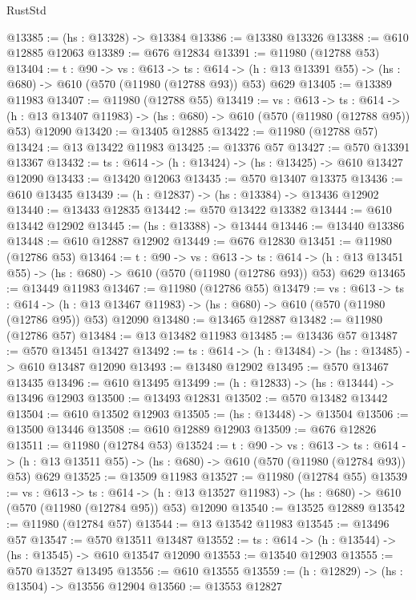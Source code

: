 \begin{lexlean}{RustStd}
\begin{coremodule}
@13385 := (hs : @13328) -> @13384
@13386 := @13380 @13326
@13388 := @610 @12885 @12063
@13389 := @676 @12834
@13391 := @11980 (@12788 @53)
@13404 := {t : @90} ->
  {vs : @613} ->
  {ts : @614} -> (h : @13 @13391 @55) -> (hs : @680) -> @610 (@570 (@11980 (@12788 @93)) @53) @629
@13405 := @13389 @11983
@13407 := @11980 (@12788 @55)
@13419 := {vs : @613} ->
  {ts : @614} ->
  (h : @13 @13407 @11983) -> (hs : @680) -> @610 (@570 (@11980 (@12788 @95)) @53) @12090
@13420 := @13405 @12885
@13422 := @11980 (@12788 @57)
@13424 := @13 @13422 @11983
@13425 := @13376 @57
@13427 := @570 @13391 @13367
@13432 := {ts : @614} -> (h : @13424) -> (hs : @13425) -> @610 @13427 @12090
@13433 := @13420 @12063
@13435 := @570 @13407 @13375
@13436 := @610 @13435
@13439 := (h : @12837) -> (hs : @13384) -> @13436 @12902
@13440 := @13433 @12835
@13442 := @570 @13422 @13382
@13444 := @610 @13442 @12902
@13445 := (hs : @13388) -> @13444
@13446 := @13440 @13386
@13448 := @610 @12887 @12902
@13449 := @676 @12830
@13451 := @11980 (@12786 @53)
@13464 := {t : @90} ->
  {vs : @613} ->
  {ts : @614} -> (h : @13 @13451 @55) -> (hs : @680) -> @610 (@570 (@11980 (@12786 @93)) @53) @629
@13465 := @13449 @11983
@13467 := @11980 (@12786 @55)
@13479 := {vs : @613} ->
  {ts : @614} ->
  (h : @13 @13467 @11983) -> (hs : @680) -> @610 (@570 (@11980 (@12786 @95)) @53) @12090
@13480 := @13465 @12887
@13482 := @11980 (@12786 @57)
@13484 := @13 @13482 @11983
@13485 := @13436 @57
@13487 := @570 @13451 @13427
@13492 := {ts : @614} -> (h : @13484) -> (hs : @13485) -> @610 @13487 @12090
@13493 := @13480 @12902
@13495 := @570 @13467 @13435
@13496 := @610 @13495
@13499 := (h : @12833) -> (hs : @13444) -> @13496 @12903
@13500 := @13493 @12831
@13502 := @570 @13482 @13442
@13504 := @610 @13502 @12903
@13505 := (hs : @13448) -> @13504
@13506 := @13500 @13446
@13508 := @610 @12889 @12903
@13509 := @676 @12826
@13511 := @11980 (@12784 @53)
@13524 := {t : @90} ->
  {vs : @613} ->
  {ts : @614} -> (h : @13 @13511 @55) -> (hs : @680) -> @610 (@570 (@11980 (@12784 @93)) @53) @629
@13525 := @13509 @11983
@13527 := @11980 (@12784 @55)
@13539 := {vs : @613} ->
  {ts : @614} ->
  (h : @13 @13527 @11983) -> (hs : @680) -> @610 (@570 (@11980 (@12784 @95)) @53) @12090
@13540 := @13525 @12889
@13542 := @11980 (@12784 @57)
@13544 := @13 @13542 @11983
@13545 := @13496 @57
@13547 := @570 @13511 @13487
@13552 := {ts : @614} -> (h : @13544) -> (hs : @13545) -> @610 @13547 @12090
@13553 := @13540 @12903
@13555 := @570 @13527 @13495
@13556 := @610 @13555
@13559 := (h : @12829) -> (hs : @13504) -> @13556 @12904
@13560 := @13553 @12827

\end{coremodule}
\end{lexlean}
